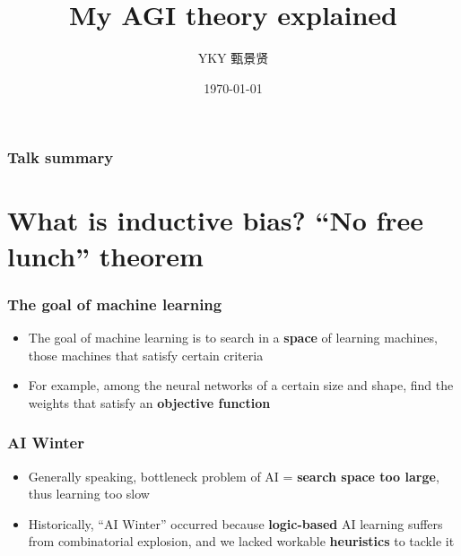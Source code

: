 \documentclass[17pt]{beamer}
\title[AGI theory]{My AGI theory explained} %
\author{YKY 甄景贤} %
\institute[] %
{
Independent researcher, Hong Kong \\ %
\medskip
\textit{generic.intelligence@gmail.com} %
}
\date{\today} %
\begin{document}
\frame{\titlepage}

\begin{frame}
\frametitle{Talk summary}
\tableofcontents
\end{frame}

%
%




\section[Section]{What is inductive bias? ``No free lunch'' theorem}
\frame{\sectionpage}

\begin{frame}
\frametitle{The goal of machine learning}
\begin{itemize}
	\item The goal of machine learning is to search in a \textbf{space} of learning machines, those machines that satisfy certain criteria
	\item For example, among the neural networks of a certain size and shape, find the weights that satisfy an \textbf{objective function}
\end{itemize}
\end{frame}

\begin{frame}
\frametitle{AI Winter}
\begin{itemize}
	\item Generally speaking, bottleneck problem of AI = {\color{red}\textbf{search space too large}}, thus learning too slow
	\item Historically, ``AI Winter'' occurred because \textbf{logic-based} AI learning suffers from combinatorial explosion, and we lacked workable \textbf{heuristics} to tackle it
\end{itemize}
\end{frame}
\end{document}
